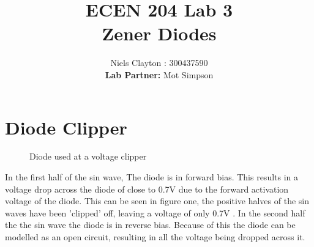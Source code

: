 \documentclass[a4paper,11pt]{article}
\begin{document}
\title{\LARGE{\textbf{ECEN 204 Lab 3}\\Zener Diodes}}
\author{Niels Clayton : 300437590\\ \textbf{Lab Partner: }Mot Simpson}
\date{}
\maketitle

\section{Diode Clipper}

\begin{figure}[h]
\centering
{}
\caption{Diode used at a voltage clipper}
\end{figure}
In the first half of the sin wave, The diode is in forward bias. This results in a voltage drop across the diode of close to 0.7V  due to the forward activation voltage of the diode. This can be seen in figure one, the positive halves of the sin waves have been 'clipped' off, leaving a voltage of only 0.7V . In the second half the the sin wave the diode is in reverse bias. Because of this the diode can be modelled  as an open circuit, resulting in all the voltage being dropped across it.
\newpage
\end{document}
